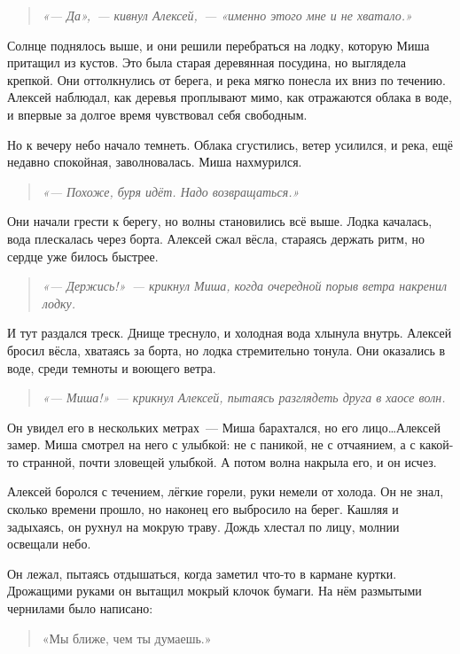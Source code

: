 \documentclass[12pt,a4paper]{book}
\newenvironment{dialogue}{\begin{quote}\itshape}{\end{quote}} %
\begin{document}
\begin{dialogue}
«--- Да»,~--- кивнул Алексей,~--- «именно этого мне и не хватало.»
\end{dialogue}

Солнце поднялось выше, и они решили перебраться на лодку, которую Миша притащил из кустов. Это была старая деревянная посудина, но выглядела крепкой. Они оттолкнулись от берега, и река мягко понесла их вниз по течению. Алексей наблюдал, как деревья проплывают мимо, как отражаются облака в воде, и впервые за долгое время чувствовал себя свободным.

Но к вечеру небо начало темнеть. Облака сгустились, ветер усилился, и река, ещё недавно спокойная, заволновалась. Миша нахмурился.

\begin{dialogue}
«--- Похоже, буря идёт. Надо возвращаться.»
\end{dialogue}

Они начали грести к берегу, но волны становились всё выше. Лодка качалась, вода плескалась через борта. Алексей сжал вёсла, стараясь держать ритм, но сердце уже билось быстрее.

\begin{dialogue}
«--- Держись!»~--- крикнул Миша, когда очередной порыв ветра накренил лодку.
\end{dialogue}

И тут раздался треск. Днище треснуло, и холодная вода хлынула внутрь. Алексей бросил вёсла, хватаясь за борта, но лодка стремительно тонула. Они оказались в воде, среди темноты и воющего ветра.

\begin{dialogue}
«--- Миша!»~--- крикнул Алексей, пытаясь разглядеть друга в хаосе волн.
\end{dialogue}

Он увидел его в нескольких метрах~--- Миша барахтался, но его лицо\ldots Алексей замер. Миша смотрел на него с улыбкой: не с паникой, не с отчаянием, а с какой-то странной, почти зловещей улыбкой. А потом волна накрыла его, и он исчез.

Алексей боролся с течением, лёгкие горели, руки немели от холода. Он не знал, сколько времени прошло, но наконец его выбросило на берег. Кашляя и задыхаясь, он рухнул на мокрую траву. Дождь хлестал по лицу, молнии освещали небо.

Он лежал, пытаясь отдышаться, когда заметил что-то в кармане куртки. Дрожащими руками он вытащил мокрый клочок бумаги. На нём размытыми чернилами было написано:
\begin{quote}
«Мы ближе, чем ты думаешь.»
\end{quote}
\end{document}
